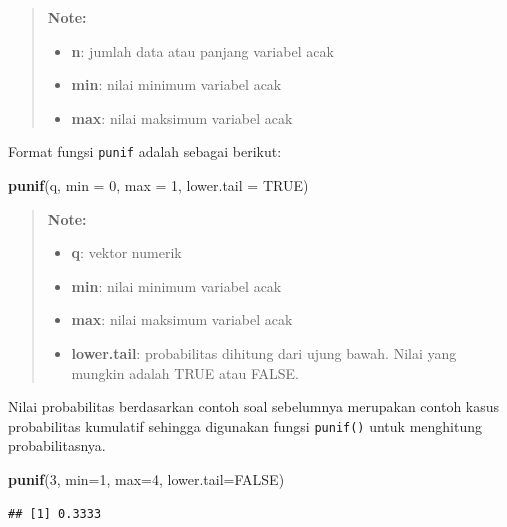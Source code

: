 \documentclass[]{book}
\newenvironment{Shaded}{\begin{snugshade}}{\end{snugshade}}
\newcommand{\KeywordTok}[1]{\textcolor[rgb]{0.13,0.29,0.53}{\textbf{#1}}}
\newcommand{\DataTypeTok}[1]{\textcolor[rgb]{0.13,0.29,0.53}{#1}}
\newcommand{\DecValTok}[1]{\textcolor[rgb]{0.00,0.00,0.81}{#1}}
\newcommand{\OtherTok}[1]{\textcolor[rgb]{0.56,0.35,0.01}{#1}}
\newcommand{\NormalTok}[1]{#1}
\providecommand{\tightlist}{%
  \setlength{\itemsep}{0pt}\setlength{\parskip}{0pt}}
\begin{document}
\begin{quote}
\textbf{Note: }

\begin{itemize}
\tightlist
\item
  \textbf{n}: jumlah data atau panjang variabel acak
\item
  \textbf{min}: nilai minimum variabel acak
\item
  \textbf{max}: nilai maksimum variabel acak
\end{itemize}
\end{quote}

Format fungsi \texttt{punif} adalah sebagai berikut:

\begin{Shaded}
\begin{Highlighting}[]
\KeywordTok{punif}\NormalTok{(q, }\DataTypeTok{min =} \DecValTok{0}\NormalTok{, }\DataTypeTok{max =} \DecValTok{1}\NormalTok{, }\DataTypeTok{lower.tail =} \OtherTok{TRUE}\NormalTok{)}
\end{Highlighting}
\end{Shaded}

\begin{quote}
\textbf{Note: }

\begin{itemize}
\tightlist
\item
  \textbf{q}: vektor numerik
\item
  \textbf{min}: nilai minimum variabel acak
\item
  \textbf{max}: nilai maksimum variabel acak
\item
  \textbf{lower.tail}: probabilitas dihitung dari ujung bawah. Nilai
  yang mungkin adalah TRUE atau FALSE.
\end{itemize}
\end{quote}

Nilai probabilitas berdasarkan contoh soal sebelumnya merupakan contoh
kasus probabilitas kumulatif sehingga digunakan fungsi \texttt{punif()}
untuk menghitung probabilitasnya.

\begin{Shaded}
\begin{Highlighting}[]
\KeywordTok{punif}\NormalTok{(}\DecValTok{3}\NormalTok{, }\DataTypeTok{min=}\DecValTok{1}\NormalTok{, }\DataTypeTok{max=}\DecValTok{4}\NormalTok{, }\DataTypeTok{lower.tail=}\OtherTok{FALSE}\NormalTok{)}
\end{Highlighting}
\end{Shaded}

\begin{verbatim}
## [1] 0.3333
\end{verbatim}
\end{document}
